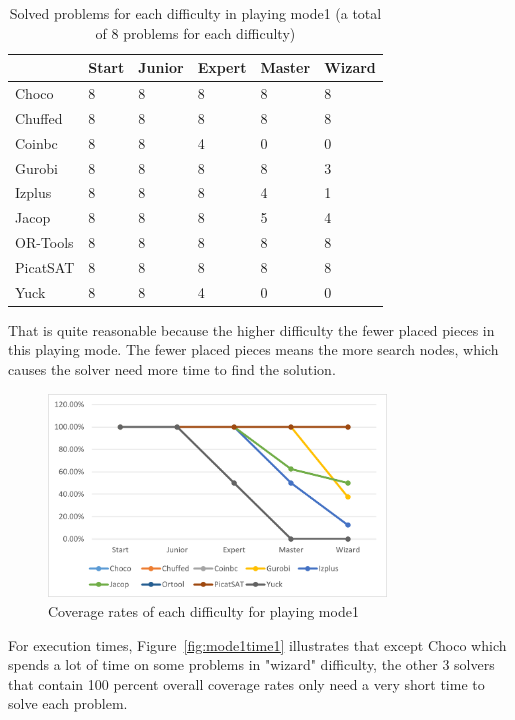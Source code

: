 \begin{table}[H]
\centering
\caption{Solved problems for each difficulty in playing mode1 (a total of 8 problems for each difficulty)}
\label{tab:solvedproblemforeach difficulty1}
\begin{tabular}{|l|l|l|l|l|l|}
\hline
	    &Start	&Junior	&Expert	&Master	&Wizard\\
\hline
Choco	&8	&8	&8	&8	&8\\
\hline
Chuffed	&8	&8	&8	&8	&8\\
\hline
Coinbc	&8	&8	&4	&0	&0\\
\hline
Gurobi	&8	&8	&8	&8	&3\\
\hline
Izplus	&8	&8	&8	&4	&1\\
\hline
Jacop	&8	&8	&8	&5	&4\\
\hline
OR-Tools	&8	&8	&8	&8	&8\\
\hline
PicatSAT	&8	&8	&8	&8	&8\\
\hline
Yuck	&8	&8	&4	&0	&0\\
\hline
\end{tabular}
\end{table}
That is quite reasonable because the higher difficulty the fewer placed pieces in this playing mode. The fewer placed pieces means the more search nodes, which causes the solver need more time to find the solution.
\begin{figure}[H]
    \centering
    \includegraphics[width=0.8\textwidth]{figs/mode1seperatedcoverage.png}
    \caption{Coverage rates of each difficulty for playing mode1}
    \label{fig:mode1eva4}
\end{figure}
For execution times, Figure~\ref{fig:mode1time1} illustrates that except Choco which spends a lot of time on some problems in  "wizard" difficulty, the other 3 solvers that contain 100 percent overall coverage rates only need a very short time to solve each problem. 
